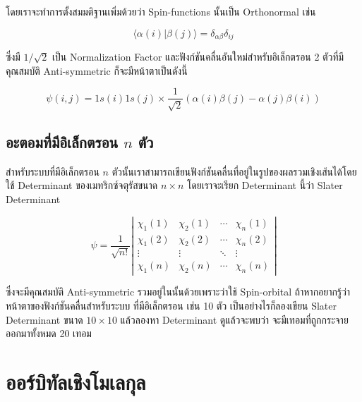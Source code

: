 \noindent โดยเราจะทำการตั้งสมมติฐานเพิ่มด้วยว่า Spin-functions นั้นเป็น Orthonormal เช่น

\begin{equation}
    \label{eq:Spin_function_orthogonality}
    \langle\alpha(i) | \beta(j)\rangle=\delta_{\alpha \beta} \delta_{i j}
\end{equation}

\noindent ซึ่งมี $1 / \sqrt{2}$ เป็น Normalization Factor และฟังก์ชันคลื่นอันใหม่สำหรับอิเล็กตรอน 2 ตัวที่มีคุณสมบัติ Anti-symmetric
ก็จะมีหน้าตาเป็นดังนี้

\begin{equation}
    \psi(i, j)
    =
    1 s(i) 1 s(j) \times \frac{1}{\sqrt{2}}(\alpha(i) \beta(j)-\alpha(j) \beta(i))
\end{equation}

\subsection{อะตอมที่มีอิเล็กตรอน $n$ ตัว}

สำหรับระบบที่มีอิเล็กตรอน $n$ ตัวนั้นเราสามารถเขียนฟังก์ชันคลื่นที่อยู่ในรูปของผลรวมเชิงเส้นได้โดยใช้ Determinant ของเมทริกซ์จตุรัสขนาด
$n \times n$ โดยเราจะเรียก Determinant นี้ว่า Slater Determinant

\begin{equation}
    \label{eq:Slater_determinant}
    \psi =
    \frac{1}{\sqrt{n !}}
    \left|
    \begin{array}{cccc}
        \chi_1(1) & \chi_2(1) & \cdots & \chi_n(1) \\
        \chi_1(2) & \chi_2(2) & \cdots & \chi_n(2) \\
        \vdots    & \vdots    & \ddots & \vdots    \\
        \chi_1(n) & \chi_2(n) & \cdots & \chi_n(n)
    \end{array}
    \right|
\end{equation}

\noindent ซึ่งจะมีคุณสมบัติ Anti-symmetric รวมอยู่ในนั้นด้วยเพราะว่าใช้ Spin-orbital ถ้าหากอยากรู้ว่าหน้าตาของฟังก์ชันคลื่นสำหรับระบบ%
ที่มีอิเล็กตรอน เช่น 10 ตัว เป็นอย่างไรก็ลองเขียน Slater Determinant ขนาด $10 \times 10$ แล้วลองหา Determinant ดูแล้วจะพบว่า%
จะมีเทอมที่ถูกกระจายออกมาทั้งหมด 20 เทอม

\section{ออร์บิทัลเชิงโมเลกุล}

